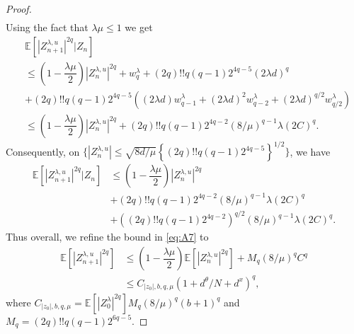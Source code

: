 \documentclass[10pt,a4paper]{amsart}
\begin{document}
\begin{proof}
\begin{align*}
\end{align*}
Using the fact that $\lambda\mu\leq 1$ we get
\begin{align*}
&\mathbb{E}\left[|Z_{n+1}^{\lambda,u}|^{2q}|Z_n\right]\\&\leq \left(1-\dfrac{\lambda\mu}{2}\right)|Z_n^{\lambda,u}|^{2q}+w_q^{\lambda}+(2q)!!q(q-1)2^{4q-5}(2\lambda d)^q\\
&+(2q)!!q(q-1)2^{4q-5}\left((2\lambda d)w_{q-1}^{\lambda}+(2\lambda d)^2w_{q-2}^{\lambda}+(2\lambda d)^{q/2}w_{q/2}^{\lambda}\right)\\
&\leq   \left(1-\dfrac{\lambda\mu}{2}\right)|Z_n^{\lambda,u}|^{2q}+(2q)!!q(q-1)2^{4q-2}(8/\mu)^{q-1}\lambda(2C)^q.
\end{align*}
Consequently, on $\{|Z_n^{\lambda,u}|\leq \sqrt{8d/\mu}\left\{(2q)!!q(q-1)2^{4q-5}\right\}^{1/2}\}$, we have
\begin{align*}
\mathbb{E}\left[|Z_{n+1}^{\lambda,u}|^{2q}|Z_n\right]&\leq  \left(1-\dfrac{\lambda\mu}{2}\right)|Z_n^{\lambda,u}|^{2q}\\&+(2q)!!q(q-1)2^{4q-2}(8/\mu)^{q-1}\lambda(2C)^q\\&+\left((2q)!!q(q-1)2^{4q-2}\right)^{q/2}(8/\mu)^{q-1}\lambda(2C)^q.
\end{align*}
Thus overall, we refine the bound in \eqref{eq:A7} to
\begin{align*}
\mathbb{E}\left[|Z_{n+1}^{\lambda,u}|^{2q}\right]&\leq  \left(1-\dfrac{\lambda\mu}{2}\right)\mathbb{E}\left[|Z_n^{\lambda,u}|^{2q}\right] +M_q(8/\mu)^{q} C^q\\
&\leq C_{|z_0|,b,q,\mu}(1+d^{\theta}/N+d^x)^q,
\end{align*}
where $C_{|z_0|,b,q,\mu}=\mathbb{E}\left[|Z_{0}^{\lambda}|^{2q}\right]M_q(8/\mu)^q(b+1)^{q}$ and $M_q=(2q)!!q(q-1)2^{6q-5}$.
\end{proof}
\end{document}
